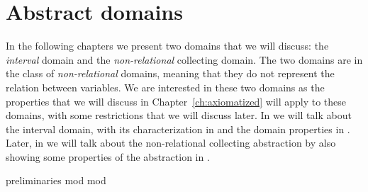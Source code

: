 \chapter{Abstract domains}\label{ch:abstractdomains}


In the following chapters we present two domains that we will discuss:
the \emph{interval} domain and the \emph{non-relational} collecting
domain. The two domains are in the class of \emph{non-relational}
domains, meaning that they do not represent the relation between
variables. We are interested in these two domains as the properties
that we will discuss in Chapter~\ref{ch:axiomatized} will apply to
these domains, with some restrictions that we will discuss later. In
 we will talk about the interval domain, with
its characterization in  and the domain
properties in .  Later, in
 we will talk about the non-relational
collecting abstraction by also showing some properties of the
abstraction in .

{preliminaries}
{mod}
{mod}

